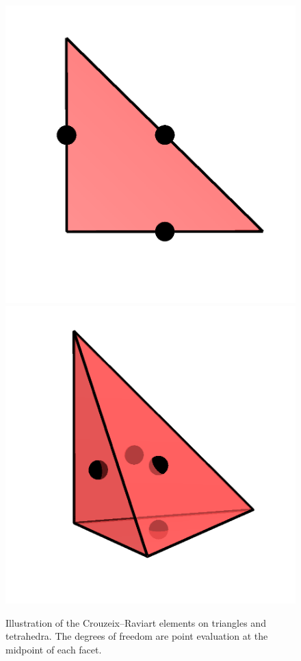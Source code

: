 \begin{figure}
  \begin{center}
    \includegraphics[width=\elmfigsizedouble]{chapters/kirby-6/png/CR1_2d.png}
    \includegraphics[width=\elmfigsizedouble]{chapters/kirby-6/png/CR1_3d.png}
    \caption{Illustration of the Crouzeix--Raviart elements on
      triangles and tetrahedra. The degrees of freedom are point
      evaluation at the midpoint of each facet.}
    \label{kirby-6:fig:cr:tri}
  \end{center}
\end{figure}


